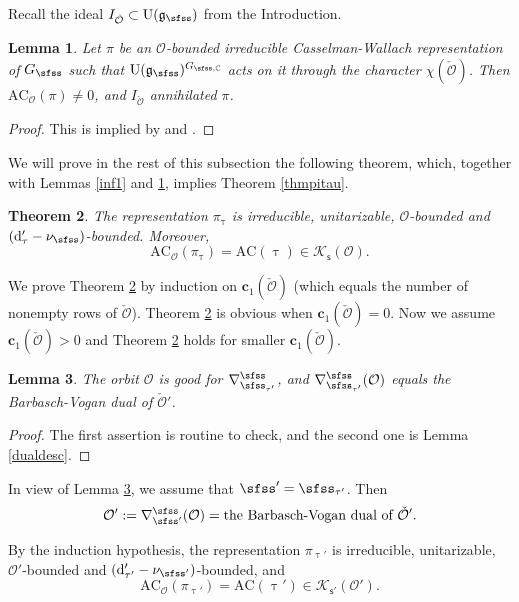 \documentclass[12pt,a4paper]{amsart}
\newcommand{\CK}{{\mathcal {K}}}
\newcommand{\CO}{{\mathcal {O}}}
\newcommand{\oU}{\operatorname{U}}
\newcommand{\g}{\mathfrak g}
\numberwithin{equation}{section}
\newtheorem{thm}{Theorem}[section]
\newtheorem{lem}[thm]{Lemma}
\theoremstyle{remark}
\begin{document}
Recall the ideal $I_{\check \CO}\subset \oU(\g_\sfss)$ from the Introduction. 
\begin{lem}\label{inf2}
Let $\pi$ be an $\CO$-bounded irreducible Casselman-Wallach representation of $G_{\sfss}$ such that $\oU(\g_\sfss)^{G_{\sfss, \C}}$ acts on it  through the character $\chi(\check \CO)$. Then $\mathrm{AC}_{\CO}(\pi)\neq 0$, and  $I_{\check \CO}$ annihilated $\pi$. 
\end{lem}
\begin{proof}
This is implied by \cite[Theorem ?]{BK} and \cite[Theorem 8.4]{Vo89}. 

\end{proof}


We will prove in the rest of this subsection the following theorem, which, together with Lemmas \ref{inf1} and \ref{inf2},  implies  Theorem \ref{thmpitau}. 
\begin{thm}\label{thmpitau222}
The representation $\pi_\uptau$ is irreducible, unitarizable, $\CO$-bounded and $( \mathrm d'_\tau-\nu_{\sfss})$-bounded.     Moreover,
\[
\mathrm{AC}_\CO(\pi_\uptau)=\mathrm{AC}(\uptau)\in \CK_{\mathsf s}(\CO).
\]
\end{thm}

We prove Theorem \ref{thmpitau222} by induction on $\mathbf c_1(\check \CO)$ (which equals the number of nonempty rows of $\check \CO$).  Theorem \ref{thmpitau222} is obvious when $\mathbf c_1(\check \CO)=0$. Now we assume $\mathbf c_1(\check \CO)>0$ and Theorem \ref{thmpitau222} holds for  smaller $\mathbf c_1(\check \CO)$. 

 \begin{lem}\label{lem78}
 The orbit $\CO$ is good for $\nabla^\sfss_{\sfss_{\tau'}}$, and $\nabla^\sfss_{\sfss_{\tau'}}(\CO)$ equals the Barbasch-Vogan dual  of $\check \CO'$. 
 \end{lem}
\begin{proof}
The first assertion is routine to check, and the second one is Lemma \ref{dualdesc}. %
\end{proof}

In view of Lemma \ref{lem78}, we assume that $\sfss'=\sfss_{\tau'}$. Then   
\[
\CO':= \nabla^\sfss_{\sfss'}(\CO)=\textrm{the Barbasch-Vogan dual  of $\check \CO'$}.
\]



By the induction hypothesis, the representation $\pi_{\uptau'}$ is irreducible, unitarizable, $\CO'$-bounded and $( \mathrm d'_{\tau'}-\nu_{\sfss'})$-bounded,     and
\[
\mathrm{AC}_\CO(\pi_{\uptau'})=\mathrm{AC}(\uptau')\in \CK_{\mathsf s'}(\CO').
\]
\end{document}
